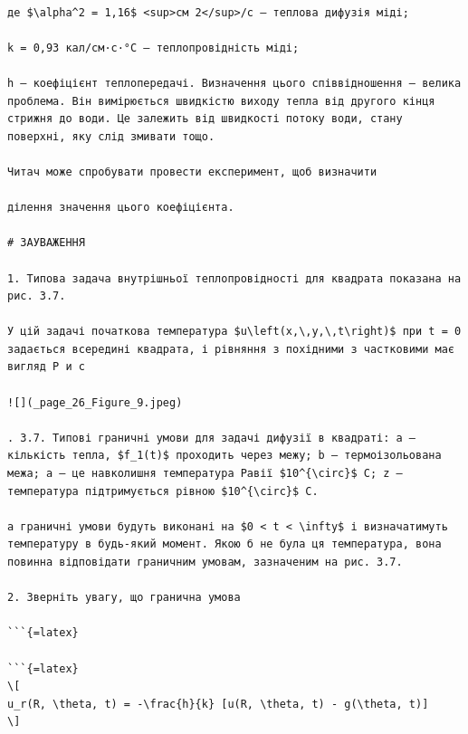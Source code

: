 \documentclass[
]{article}
\begin{document}
\begin{verbatim}

де $\alpha^2 = 1,16$ <sup>см 2</sup>/с — теплова дифузія міді;

k = 0,93 кал/см·с·°C — теплопровідність міді;

h — коефіцієнт теплопередачі. Визначення цього співвідношення — велика проблема. Він вимірюється швидкістю виходу тепла від другого кінця стрижня до води. Це залежить від швидкості потоку води, стану поверхні, яку слід змивати тощо.

Читач може спробувати провести експеримент, щоб визначити

ділення значення цього коефіцієнта.

# ЗАУВАЖЕННЯ

1. Типова задача внутрішньої теплопровідності для квадрата показана на рис. 3.7.

У цій задачі початкова температура $u\left(x,\,y,\,t\right)$ при t = 0 задається всередині квадрата, і рівняння з похідними з частковими має вигляд Р и с

![](_page_26_Figure_9.jpeg)

. 3.7. Типові граничні умови для задачі дифузії в квадраті: a — кількість тепла, $f_1(t)$ проходить через межу; b — термоізольована межа; a — це навколишня температура Равії $10^{\circ}$ C; z — температура підтримується рівною $10^{\circ}$ C.

а граничні умови будуть виконані на $0 < t < \infty$ і визначатимуть температуру в будь-який момент. Якою б не була ця температура, вона повинна відповідати граничним умовам, зазначеним на рис. 3.7.

2. Зверніть увагу, що гранична умова

```{=latex}

```{=latex}
\[
u_r(R, \theta, t) = -\frac{h}{k} [u(R, \theta, t) - g(\theta, t)]
\]
\end{verbatim}
\end{document}
